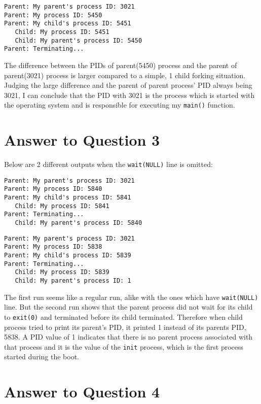 \documentclass{article}
\begin{document}
\begin{lstlisting}
Parent: My parent's process ID: 3021 
Parent: My process ID: 5450 
Parent: My child's process ID: 5451 
   Child: My process ID: 5451 
   Child: My parent's process ID: 5450 
Parent: Terminating...

\end{lstlisting}

The difference between the PIDs of parent(5450) process and the parent of parent(3021) process is larger compared to a simple, 1 child 
forking situation. Judging the large difference and the parent of parent process' PID always being 3021, I can conclude that the PID with
3021 is the process which is started with the operating system and is responsible for executing my \texttt{main()} function.

\section{Answer to Question 3}
Below are 2 different outputs when the \texttt{wait(NULL)} line is omitted:

\begin{lstlisting}
Parent: My parent's process ID: 3021 
Parent: My process ID: 5840 
Parent: My child's process ID: 5841 
   Child: My process ID: 5841 
Parent: Terminating...
   Child: My parent's process ID: 5840
\end{lstlisting}

\begin{lstlisting}
Parent: My parent's process ID: 3021 
Parent: My process ID: 5838 
Parent: My child's process ID: 5839 
Parent: Terminating...
   Child: My process ID: 5839 
   Child: My parent's process ID: 1 

\end{lstlisting}

The first run seems like a regular run, alike with the ones which have \texttt{wait(NULL)} line. But the second run shows that the parent process
did not wait for its child to \texttt{exit(0)} and terminated before its child terminated. Therefore when child process tried to print its
parent's PID, it printed 1 instead of its parents PID, 5838. A PID value of 1 indicates that there is no parent process associated with that 
process and it is the value of the \texttt{init} process, which is the first process started during the boot.

\newpage
\section{Answer to Question 4}
\end{document}
